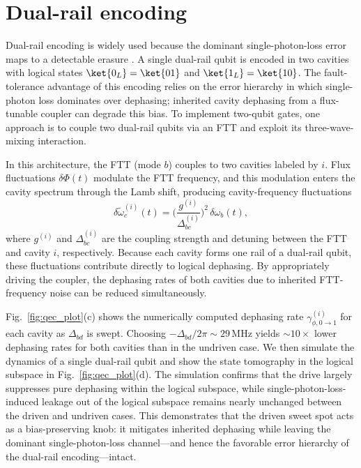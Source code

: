 \section{Dual-rail encoding}
\label{sec:dualrail}
Dual-rail encoding is widely used because the dominant single-photon-loss error maps to a detectable erasure \cite{dualrailcavity1,teoh2023dual}. A single dual-rail qubit is encoded in two cavities with logical states \(\ket{0_L}=\ket{01}\) and \(\ket{1_L}=\ket{10}\). The fault-tolerance advantage of this encoding relies on the error hierarchy in which single-photon loss dominates over dephasing; inherited cavity dephasing from a flux-tunable coupler can degrade this bias. To implement two-qubit gates, one approach is to couple two dual-rail qubits via an FTT and exploit its three-wave-mixing interaction.

In this architecture, the FTT (mode \(b\)) couples to two cavities labeled by \(i\). Flux fluctuations \(\delta\Phi(t)\) modulate the FTT frequency, and this modulation enters the cavity spectrum through the Lamb shift, producing cavity-frequency fluctuations
\begin{equation}
\delta \widetilde{\omega}^{(i)}_{c}(t)=\biggl(\frac{g^{(i)}}{\Delta^{(i)}_{bc}}\biggr)^2\,\delta\omega_b(t),
\end{equation}
where \(g^{(i)}\) and \(\Delta^{(i)}_{bc}\) are the coupling strength and detuning between the FTT and cavity \(i\), respectively. Because each cavity forms one rail of a dual-rail qubit, these fluctuations contribute directly to logical dephasing. By appropriately driving the coupler, the dephasing rates of both cavities due to inherited FTT-frequency noise can be reduced simultaneously.

Fig.~\ref{fig:qec_plot}(c) shows the numerically computed dephasing rate \(\gamma_{\phi,0\rightarrow 1}^{(i)}\) for each cavity as \(\Delta_{bd}\) is swept. Choosing \(-\Delta_{bd}/2\pi\sim 29\,\mathrm{MHz}\) yields \(\sim 10\times\) lower dephasing rates for both cavities than in the undriven case. We then simulate the dynamics of a single dual-rail qubit and show the state tomography in the logical subspace in Fig.~\ref{fig:qec_plot}(d). The simulation confirms that the drive largely suppresses pure dephasing within the logical subspace, while single-photon-loss-induced leakage out of the logical subspace remains nearly unchanged between the driven and undriven cases. This demonstrates that the driven sweet spot acts as a bias-preserving knob: it mitigates inherited dephasing while leaving the dominant single-photon-loss channel---and hence the favorable error hierarchy of the dual-rail encoding---intact.

